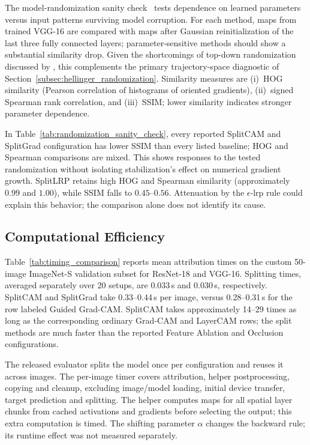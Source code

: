 The model-randomization sanity check~\parencite{Adebayo2018sanity} tests dependence on learned parameters versus input patterns surviving model corruption. For each method, maps from trained VGG-16 are compared with maps after Gaussian reinitialization of the last three fully connected layers; parameter-sensitive methods should show a substantial similarity drop. Given the shortcomings of top-down randomization discussed by \textcite{Binder2022shortcomings}, this complements the primary trajectory-space diagnostic of Section~\ref{subsec:hellinger_randomization}. Similarity measures are (i)~HOG similarity (Pearson correlation of histograms of oriented gradients), (ii)~signed Spearman rank correlation, and (iii)~SSIM; lower similarity indicates stronger parameter dependence.



In Table~\ref{tab:randomization_sanity_check}, every reported SplitCAM and SplitGrad configuration has lower SSIM than every listed baseline; HOG and Spearman comparisons are mixed. This shows responses to the tested randomization without isolating stabilization's effect on numerical gradient growth. SplitLRP retains high HOG and Spearman similarity (approximately $0.99$ and $1.00$), while SSIM falls to $0.45$--$0.56$. Attenuation by the $\epsilon$-\ac{lrp} rule could explain this behavior; the comparison alone does not identify its cause.

\subsection{Computational Efficiency}\label{app:p1_timing}

Table~\ref{tab:timing_comparison} reports mean attribution times on the custom 50-image ImageNet-S validation subset for ResNet-18 and VGG-16. Splitting times, averaged separately over 20 setups, are 0.033\,s and 0.030\,s, respectively. SplitCAM and SplitGrad take 0.33--0.44\,s per image, versus 0.28--0.31\,s for the row labeled Guided Grad-CAM. SplitCAM takes approximately 14--29 times as long as the corresponding ordinary Grad-CAM and LayerCAM rows; the split methods are much faster than the reported Feature Ablation and Occlusion configurations.

The released evaluator splits the model once per configuration and reuses it across images. The per-image timer covers attribution, helper postprocessing, copying and cleanup, excluding image/model loading, initial device transfer, target prediction and splitting. The helper computes maps for all spatial layer chunks from cached activations and gradients before selecting the output; this extra computation is timed. The shifting parameter $\alpha$ changes the backward rule; its runtime effect was not measured separately.

